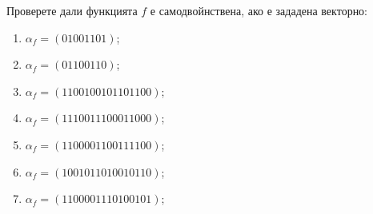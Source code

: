 \begin{problem}
  Проверете дали функцията $f$ е самодвойнствена, ако е зададена векторно:
  \begin{enumerate}[1)]
  \item
    $\alpha_f = (01001101)$;
  \item
    $\alpha_f = (01100110)$;
  \item
    $\alpha_f = (1100 1001 0110 1100)$;
  \item
    $\alpha_f = (1110 0111 0001 1000)$;
  \item
    $\alpha_f = (1100 0011 0011 1100)$;
  \item
    $\alpha_f = (1001 0110 1001 0110)$;
  \item
    $\alpha_f = (1100 0011 1010 0101)$;
  \end{enumerate}
\end{problem}


